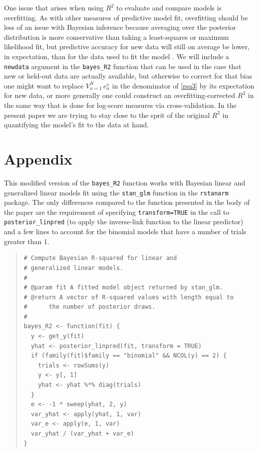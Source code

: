 \documentclass[11pt]{article}
\begin{document}
One issue that arises when using $R^2$ to evaluate and compare models is
overfitting.  As with other measures of predictive model fit, overfitting should
be less of an issue with Bayesian inference because averaging over the posterior
distribution is more conservative than taking a least-squares or maximum
likelihood fit, but predictive accuracy for new data will still on average be
lower, in expectation, than for the data used to fit the model
\citep{GelmanHwangVehtari2014}. We will include a {\tt newdata} argument in the
\verb#bayes_R2# function  that can be used in the case that new or held-out data
are actually available, but otherwise to correct for that bias one might want to
replace $V_{n=1}^N \,e_n^s$ in the denominator of \eqref{rsq3} by its expectation
for new data, or more generally one could construct an overfitting-corrected
$R^2$ in the same way that is done for log-score measures via cross-validation.
In the present paper we are trying to stay close to the sprit of the original
$R^2$ in quantifying the model's fit to the data at hand.







\clearpage
\section*{Appendix}

This modified version of the \verb#bayes_R2# function works with
Bayesian linear and generalized linear models fit using the
\verb#stan_glm# function in the {\tt rstanarm} package. The only
differences compared to the function presented in the body of the paper are
the requirement of specifying \verb#transform=TRUE# in the call to
\verb#posterior_linpred# (to apply the inverse-link function to the linear
predictor) and a few lines to account for the binomial models that
have a number of trials greater than 1.
%
\vspace{-\baselineskip}
\begin{quotation}
\noindent
\begin{small}
\begin{verbatim}
# Compute Bayesian R-squared for linear and
# generalized linear models.
#
# @param fit A fitted model object returned by stan_glm.
# @return A vector of R-squared values with length equal to
#      the number of posterior draws.
#
bayes_R2 <- function(fit) {
  y <- get_y(fit)
  yhat <- posterior_linpred(fit, transform = TRUE)
  if (family(fit)$family == "binomial" && NCOL(y) == 2) {
    trials <- rowSums(y)
    y <- y[, 1]
    yhat <- yhat %*% diag(trials)
  }
  e <- -1 * sweep(yhat, 2, y)
  var_yhat <- apply(yhat, 1, var)
  var_e <- apply(e, 1, var)
  var_yhat / (var_yhat + var_e)
}
\end{verbatim}
\end{small}
\end{quotation}
\end{document}

